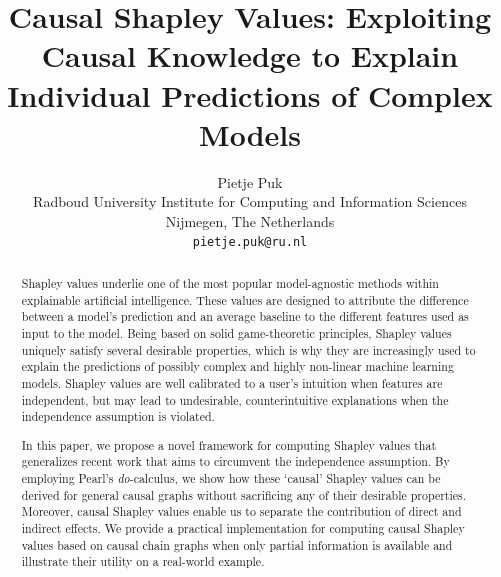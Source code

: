 \documentclass{article}
\title{Causal Shapley Values: Exploiting Causal Knowledge to Explain Individual Predictions of Complex Models}
\author{%
  Pietje Puk\\
  Radboud University
  Institute for Computing and Information Sciences\\
  Nijmegen, The Netherlands \\
  \texttt{pietje.puk@ru.nl} \\
}
\begin{document}
\maketitle

\begin{abstract}
Shapley values underlie one of the most popular model-agnostic methods within explainable artificial intelligence. These values are designed to attribute the difference between a model's prediction and an average baseline to the different features used as input to the model. Being based on solid game-theoretic principles, Shapley values uniquely satisfy several desirable properties, which is why they are increasingly used to explain the predictions of possibly complex and highly non-linear machine learning models. Shapley values are well calibrated to a user’s intuition when features are independent, but may lead to undesirable, counterintuitive explanations when the independence assumption is violated.

In this paper, we propose a novel framework for computing Shapley values that generalizes recent work that aims to circumvent the independence assumption. By employing Pearl's \textit{do}-calculus, we show how these `causal' Shapley values can be derived for general causal graphs without sacrificing any of their desirable properties. Moreover, causal Shapley values enable us to separate the contribution of direct and indirect effects. We provide a practical implementation for computing causal Shapley values based on causal chain graphs when only partial information is available and illustrate their utility on a real-world example.
\end{abstract}




\end{document}
